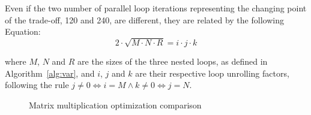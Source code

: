 Even if the two number of parallel loop iterations representing the changing point of the trade-off, 120 and 240, are different, they are related by the following Equation:
\begin{equation}
    \label{eq:factor-relation}
        2 \cdot \sqrt {M \cdot N \cdot R} = i \cdot j \cdot k
\end{equation}

where $M$, $N$ and $R$ are the sizes of the three nested loops, as defined in Algorithm~\ref{alg:var}, and $i$, $j$ and $k$ are their respective loop unrolling factors, following the rule $j \neq 0 \iff i=M \land k \neq 0 \iff j=N$.

\begin{figure}[t]
    \centering
    \hspace{0.15\textwidth}
    \caption{Matrix multiplication optimization comparison}
    \label{fig:matmul-optimization-comparison}
\end{figure}